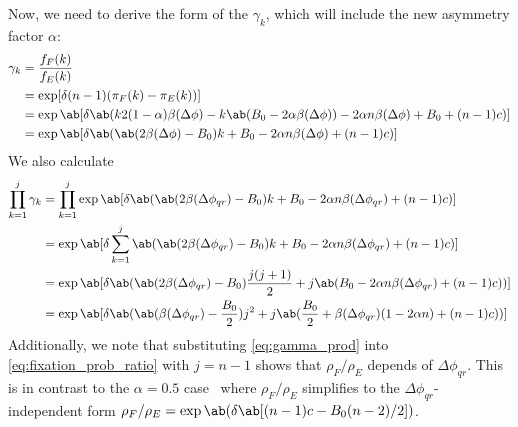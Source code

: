 Now, we need to derive the form of the $\gamma_k$,
which will include the new asymmetry factor $\alpha$:
\begin{align*}
  \gamma_k &= \frac{f_F(k)}{f_E(k)} \\
           &= \exp[\delta (n-1) (\pi_F(k) - \pi_E(k))]
           \\
           &= \exp\ab[\delta \ab(
    k 2 (1-\alpha) \beta(\Delta\phi)
    - k \ab(B_0 - 2 \alpha \beta(\Delta\phi))
                 - 2 \alpha n \beta(\Delta\phi) + B_0 + (n-1) c)] \\
      &= \exp\ab[\delta \ab(
    \ab(2 \beta(\Delta\phi) - B_0) k
                 + B_0 - 2 \alpha n \beta(\Delta\phi) + (n-1) c)]
\end{align*}
We also calculate
\begin{equation}
  \begin{aligned}
    \prod_{k=1}^j  \gamma_k
      &= \prod_{k=1}^j \exp\ab[\delta \ab(
      \ab(2 \beta(\Delta\phi_{qr}) - B_0) k
      + B_0 - 2 \alpha n \beta(\Delta\phi_{qr}) + (n-1) c)]
      \\
      &= \exp\ab[\delta \sum_{k=1}^j \ab(
      \ab(2 \beta(\Delta\phi_{qr}) - B_0) k
      + B_0 - 2 \alpha n \beta(\Delta\phi_{qr}) + (n-1) c)]
      \\
      &= \exp\ab[\delta \ab(
      \ab(2 \beta(\Delta\phi_{qr}) - B_0) \frac{j(j+1)}{2}
      + j \ab(B_0 - 2 \alpha n \beta(\Delta\phi_{qr}) + (n-1) c))]
      \\
      &= \exp\ab[\delta \ab(
      \ab(\beta(\Delta\phi_{qr}) - \frac{B_0}{2}) j^2
      + j \ab(\frac{B_0}{2} + \beta(\Delta\phi_{qr}) (1 - 2 \alpha n)  + (n-1) c))]
  \end{aligned}
  \label{eq:gamma_prod}
\end{equation}
Additionally, we note that substituting
\cref{eq:gamma_prod} into \cref{eq:fixation_prob_ratio}
with $j=n-1$ shows that $\rho_F/\rho_E$
depends of $\Delta \phi_{qr}$.
This is in contrast to the $\alpha=0.5$ case~\citep{tripp2022evolutionary}
where $\rho_F/\rho_E$ simplifies to the $\Delta \phi_{qr}$-independent form
$\rho_F/\rho_E = \exp \ab(\delta \ab[(n-1)c - B_0 (n-2)/2])$.

